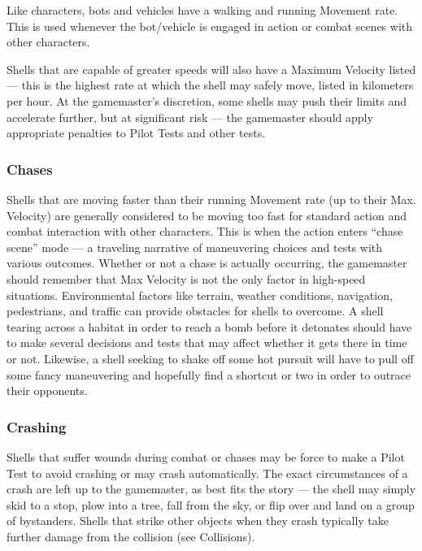 Like characters, bots and vehicles have a walking and running Movement rate. This is used whenever the bot/vehicle is engaged in action or combat scenes with other characters. 

Shells that are capable of greater speeds will also have a Maximum Velocity listed --- this is the highest rate at which the shell may safely move, listed in kilometers per hour. At the gamemaster’s discretion, some shells may push their limits and accelerate further, but at significant risk --- the gamemaster should apply appropriate penalties to Pilot Tests and other tests. 

\subsubsection{Chases} 

Shells that are moving faster than their running Movement rate (up to their Max. Velocity) are generally considered to be moving too fast for standard action and combat interaction with other characters. This is when the action enters ``chase scene'' mode --- a traveling narrative of maneuvering choices and tests with various outcomes. Whether or not a chase is actually occurring, the gamemaster should remember that Max Velocity is not the only factor in high-speed situations. Environmental factors like terrain, weather conditions, navigation, pedestrians, and traffic can provide obstacles for shells to overcome. A shell tearing across a habitat in order to reach a bomb before it detonates should have to make several decisions and tests that may affect whether it gets there in time or not. Likewise, a shell seeking to shake off some hot pursuit will have to pull off some fancy maneuvering and hopefully find a shortcut or two in order to outrace their opponents. 

\subsubsection{Crashing} 

Shells that suffer wounds during combat or chases may be force to make a Pilot Test to avoid crashing or may crash automatically. The exact circumstances of a crash are left up to the gamemaster, as best fits the story --- the shell may simply skid to a stop, plow into a tree, fall from the sky, or flip over and land on a group of bystanders. Shells that strike other objects when they crash typically take further damage from the collision (see Collisions). 

